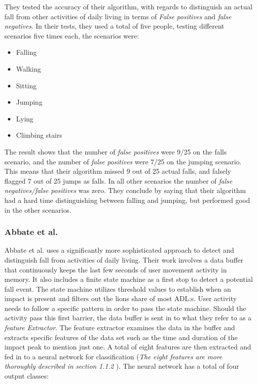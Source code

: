 \documentclass[12pt, a4paper, onecolumn]{article}
\begin{document}
	They tested the accuracy of their algorithm, with regards to distinguish an actual fall from other activities of daily living in terms of \textit{False positives} and \textit{false negatives}. In their tests, they used a total of five people, testing different scenarios five times each, the scenarios were:
	
	\begin{itemize}
		\item Falling
		\item Walking
		\item Sitting
		\item Jumping
		\item Lying
		\item Climbing stairs
	\end{itemize}
	
	The result shows that the number of \textit{false positives} were 9/25 on the falls scenario, and the number of \textit{false positives} were 7/25 on the jumping scenario. This means that their algorithm missed 9 out of 25 actual falls, and falsely flagged 7 out of 25 jumps as falls. In all other scenarios the number of \textit{false negatives/false positives} was zero. They conclude by saying that their algorithm had a hard time distinguishing between falling and jumping, but performed good in the other scenarios. 
	
	
	\subsubsection{Abbate et al.}
	Abbate et al. uses a significantly more sophisticated approach to detect and distinguish fall from activities of daily living. Their work involves a data buffer that continuously keeps the last few seconds of user movement activity in memory. It also includes a finite state machine as a first stop to detect a potential fall event. The state machine utilizes threshold values to establish when an impact is present and filters out the lions share of most ADL:s. User activity needs to follow a specific pattern in order to pass the state machine. Should the activity pass this first barrier, the data buffer is sent in to what they refer to as a \textit{feature Extractor}. The feature extractor examines the data in the buffer and extracts specific features of the data set such as the time and duration of the impact peak to mention just one. A total of eight features are then extracted and fed in to a neural network for classification  (\textit{The eight features are more thoroughly described in section 1.1.2 }). The neural network has a total of four output classes:
\end{document}
